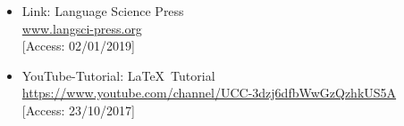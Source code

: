 \documentclass[a4paper,10pt,handout]{beamer}
\begin{document}
\begin{frame}[allowframebreaks]
{\begin{itemize}

		\item Link: Language Science Press\\
		\url{www.langsci-press.org}\\
		{[}Access: 02/01/2019]		
		
		\item YouTube-Tutorial: \LaTeX\ Tutorial\\
		\url{https://www.youtube.com/channel/UCC-3dzj6dfbWwGzQzhkUS5A}\\
		{[}Access: 23/10/2017]


%		
%		
%		
%		
%		
%		
		

\end{itemize}}
\end{frame}
\end{document}
